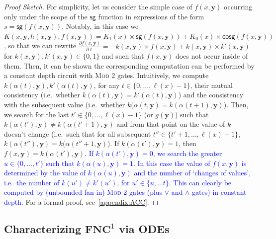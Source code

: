 \documentclass[11pt, oneside]{article}
\newcommand{\fun}[1]{\mathsf{#1}}
\newcommand{\NC}{\mathbf{FNC}}
\newcommand{\tu}[1]{\mathbf{#1}}
\theoremstyle{definition}
\begin{document}
{\begin{proof}[Proof Sketch]
    For simplicity, let us consider the simple case of $f(x, \tu y)$ occurring only under the scope of the $\fun{sg}$ function in expressions of the form $s=\fun{sg}(f(x, \tu y))$.
    Notably, in this case we $K(x, \tu y, h(x, \tu y), f(x, \tu y))= K_1(x) \times \fun{sg}(f(x, \tu y)) + K_0(x) \times \fun{cosg}(f(x, \tu y))$, so that we can rewrite $\frac{\partial f(x, \tu y)}{\partial \ell} = -k(x, \tu y) \times f(x, \tu y) + k(x, \tu y) \times k'(x, \tu y)$ for $k(x, \tu y), k'(x, \tu y) \in \{0,1\}$ and such that $f(x, \tu y)$ does not occur inside of them. 
    Then, it can be shown the corresponding  computation can be performed by a constant depth circuit with \textsc{Mod 2} gates. 
    Intuitively, we compute $k(\alpha(t),\tu y), k'(\alpha(t), \tu y)$, for any $t\in \{0,\dots, \ell(x)-1\}$, their mutual consistency (i.e.~whether $k(\alpha(t), \tu y) = k'(\alpha(t), \tu y)$) and the consistency with the subsequent value (i.e.~whether $k(\alpha(t, \tu y)=k(\alpha(t+1), \tu y)$).
    Then, we search for the last $t'\in \{0,\dots, \ell(x)-1\}$ (or $g(\tu y)$) such that $k(\alpha(t'), \tu y) \neq k(\alpha(t'+1), \tu y)$ and from that point on the value of $k$ doesn't change (i.e.~such that for all subsequent $t''\in \{t'+1, \dots, \ell(x)-1\}$, $k(\alpha(t''), \tu y)=k(\alpha(t''+1, \tu y)$).
    If $k(\alpha(t'), \tu y) =1$, then $f(x, \tu y)=k(\alpha(t'), \tu y)$.
    \textcolor{blue}{If $k(\alpha(t'), \tu y)=0$, we search the greater $u\in\{0, \dots, t'\}$ such that $k(\alpha(u), \tu y)=1$. In this case the value of $f(x, \tu y)$ is determined by the value of $k(\alpha(u), \tu y)$ and the number of  `changes of values', i.e.~the number of $k(u')\neq k'(u')$, for $u'\in \{u,\dots t\}$. This can clearly be computed by (unbounded fan-in) \textsc{Mod 2} gates (plus $\vee$ and $\wedge$ gates) in constant depth.} For a formal proof, see~\ref{appendix:ACC}.
\end{proof}
















\subsection{Characterizing $\NC^1$ via ODEs}\label{sec:chODE}

}
\end{document}
